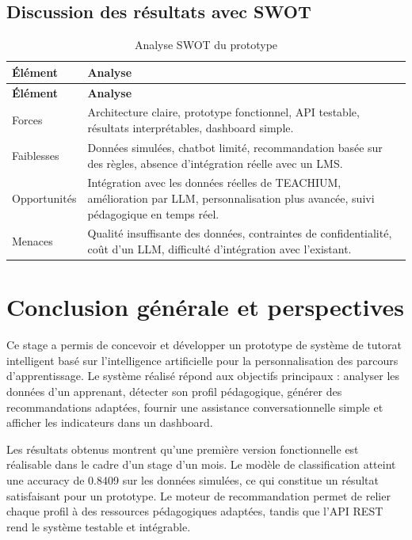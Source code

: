 \documentclass[12pt,a4paper]{report}
\begin{document}
\section{Discussion des résultats avec SWOT}

\begin{longtable}{|p{3cm}|p{11cm}|}
\caption{Analyse SWOT du prototype}\\
\hline
\textbf{Élément} & \textbf{Analyse} \\
\hline
\endfirsthead
\hline
\textbf{Élément} & \textbf{Analyse} \\
\hline
\endhead
Forces & Architecture claire, prototype fonctionnel, API testable, résultats interprétables, dashboard simple. \\
\hline
Faiblesses & Données simulées, chatbot limité, recommandation basée sur des règles, absence d'intégration réelle avec un LMS. \\
\hline
Opportunités & Intégration avec les données réelles de TEACHIUM, amélioration par LLM, personnalisation plus avancée, suivi pédagogique en temps réel. \\
\hline
Menaces & Qualité insuffisante des données, contraintes de confidentialité, coût d'un LLM, difficulté d'intégration avec l'existant. \\
\hline
\end{longtable}

\chapter*{Conclusion générale et perspectives}

Ce stage a permis de concevoir et développer un prototype de système de tutorat intelligent basé sur l'intelligence artificielle pour la personnalisation des parcours d'apprentissage. Le système réalisé répond aux objectifs principaux : analyser les données d'un apprenant, détecter son profil pédagogique, générer des recommandations adaptées, fournir une assistance conversationnelle simple et afficher les indicateurs dans un dashboard.

Les résultats obtenus montrent qu'une première version fonctionnelle est réalisable dans le cadre d'un stage d'un mois. Le modèle de classification atteint une accuracy de 0.8409 sur les données simulées, ce qui constitue un résultat satisfaisant pour un prototype. Le moteur de recommandation permet de relier chaque profil à des ressources pédagogiques adaptées, tandis que l'API REST rend le système testable et intégrable.
\end{document}
